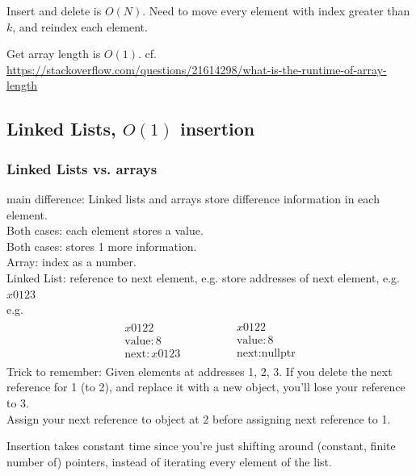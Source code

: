 \documentclass[10pt]{amsart}
\begin{document}
\begin{multicols*}{2}
Insert and delete is $O(N)$. Need to move every element with index greater than $k$, and reindex each element.

Get array length is $O(1)$. cf. \url{https://stackoverflow.com/questions/21614298/what-is-the-runtime-of-array-length} 



\subsection{Linked Lists, $O(1)$ insertion}

\subsubsection{Linked Lists vs. arrays}

main difference: Linked lists and arrays store difference information in each element. \\

Both cases: each element stores a value. \\
Both cases: stores 1 more information. \\

Array: index as a number. \\
Linked List: reference to next element, e.g. store addresses of next element, e.g. $x0123$ \\
e.g.
\[
\begin{gathered}
\begin{gathered}
x0122 \\
\text{value}: 8 \\
\text{next}: x0123
\end{gathered} \qquad \qquad \, 
\begin{gathered}
x0122 \\
\text{value}: 8 \\
\text{next}: \text{nullptr}
\end{gathered}
\end{gathered}
\]
Trick to remember: Given elements at addresses 1, 2, 3. If you delete the next reference for 1 (to 2), and replace it with a new object, you'll lose your reference to 3. \\
Assign your next reference to object at 2 before assigning next reference to 1.

Insertion takes constant time since you're just shifting around (constant, finite number of) pointers, instead of iterating every element of the list.


\end{multicols*}
\end{document}
